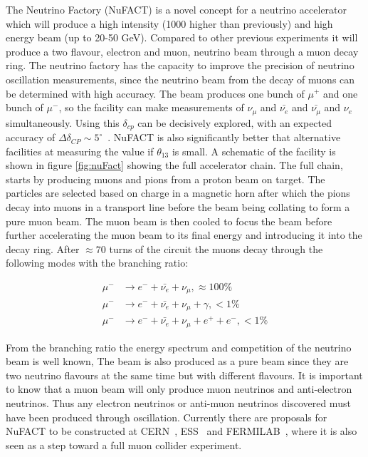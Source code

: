 The Neutrino Factory (NuFACT) is a novel concept for a neutrino accelerator which will produce a high intensity (1000 higher than previously) and high energy beam (up to 20-50 GeV). Compared to other previous experiments it will produce a two flavour, electron and muon, neutrino beam through a muon decay ring. The neutrino factory has the capacity to improve the precision of neutrino oscillation measurements, since the neutrino beam from the decay of muons can be determined with high accuracy. The beam produces one bunch of $\mu^+$ and one bunch of $\mu^-$, so the facility can make measurements of $\nu_{\mu}$ and $\bar{\nu_{e}}$ and $\bar{\nu_{\mu}}$ and $\nu_{e}$ simultaneously. Using this $\delta_{cp}$ can be decisively explored, with an expected accuracy of $\Delta \delta_{CP}\sim 5^\circ$~\cite{25NUfact}. NuFACT is also significantly better that alternative facilities at measuring the value if $\theta_{13}$ is small. A schematic of the facility is shown in figure \ref{fig:nuFact} showing the full accelerator chain. The full chain, starts by producing muons and pions from a proton beam on target. The particles are selected based on charge in a magnetic horn after which the pions decay into muons in a transport line before the beam being collating to form a pure muon beam. The muon beam is then cooled to focus the beam before further accelerating the muon beam to its final energy and introducing it into the decay ring. After $\approx 70$ turns of the circuit the muons decay through the following modes with the branching ratio:

\begin{align}
\mu^- &\rightarrow e^- + \bar{\nu_e} + \nu_\mu, \approx 100\% \\
\mu^- &\rightarrow e^- + \bar{\nu_e} + \nu_\mu + \gamma, <1\% \\
\mu^- &\rightarrow e^- + \bar{\nu_e} + \nu_\mu + e^+ + e^-, <1\%
\end{align}

From the branching ratio the energy spectrum and competition of the neutrino beam is well known, The beam is also produced as a pure beam since they are two neutrino flavours at the same time but with different flavours. It is important to know that a muon beam will only produce muon neutrinos and anti-electron neutrinos. Thus any electron neutrinos or anti-muon neutrinos discovered must have been produced through oscillation. Currently there are proposals for NuFACT to be constructed at CERN~\cite{25NUfact}, ESS~\cite{ESS} and FERMILAB~\cite{NuFACTfermi}, where it is also seen as a step toward a full muon collider experiment.

